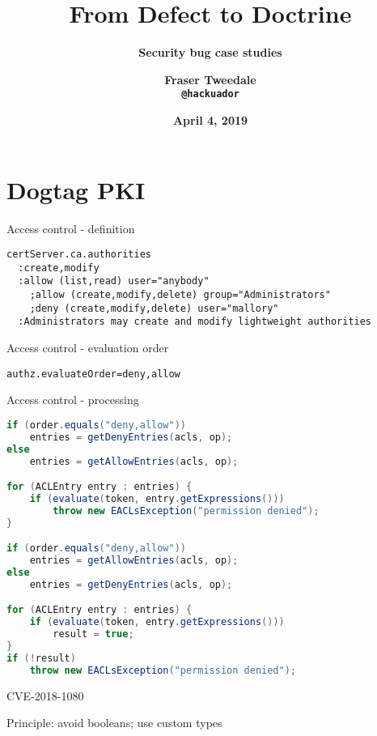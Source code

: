 \documentclass[ignorenonframetext,aspectratio=169]{beamer}
\title{\bf From Defect to Doctrine}
\subtitle{\bf Security bug case studies}
\author{\bf Fraser Tweedale\\
    \texttt{@hackuador}}
\date{\bf April 4, 2019}
\begin{document}
\begin{frame}
\titlepage
\end{frame}

\section{Dogtag PKI}\label{dogtag}

\begin{frame}{Access control - definition}
\begin{verbatim}
certServer.ca.authorities
  :create,modify
  :allow (list,read) user="anybody"
    ;allow (create,modify,delete) group="Administrators"
    ;deny (create,modify,delete) user="mallory"
  :Administrators may create and modify lightweight authorities
\end{verbatim}
\end{frame}

\begin{frame}{Access control - evaluation order}
\begin{verbatim}
authz.evaluateOrder=deny,allow
\end{verbatim}
\end{frame}

\begin{frame}[fragile]{Access control - processing}
\begin{lstlisting}[language=Java]
if (order.equals("deny,allow"))
    entries = getDenyEntries(acls, op);
else
    entries = getAllowEntries(acls, op);

for (ACLEntry entry : entries) {
    if (evaluate(token, entry.getExpressions()))
        throw new EACLsException("permission denied");
}

if (order.equals("deny,allow"))
    entries = getAllowEntries(acls, op);
else
    entries = getDenyEntries(acls, op);

for (ACLEntry entry : entries) {
    if (evaluate(token, entry.getExpressions()))
        result = true;
}
if (!result)
    throw new EACLsException("permission denied");

\end{lstlisting}
\end{frame}


\begin{frame}[plain]
\huge
CVE-2018-1080
\end{frame}


\begin{frame}[plain]
\huge
Principle: avoid booleans; use custom types
\end{frame}
\end{document}
